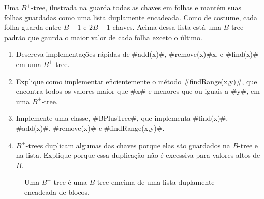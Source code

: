 \begin{exc}
  Uma $B^+$-tree, ilustrada na  guarda todas as chaves em folhas e mantém suas folhas guardadas como uma lista duplamente encadeada. 
Como de costume, cada folha guarda entre 
  $B-1$ e $2B-1$ chaves.  Acima dessa lista está uma 
  $B$-tree padrão que gaurda o maior valor de cada folha exceto o último. 
  \begin{enumerate}
    \item Descreva implementações rápidas de #add(x)#, #remove(x)#x,
      e #find(x)# em uma $B^+$-tree.
    \item Explique como implementar eficientemente o método #findRange(x,y)#,
      que encontra todos os valores maior que #x# e menores que ou iguais a #y#, 
      em uma $B^+$-tree.
    \item Implemente uma classe, #BPlusTree#, que implementa #find(x)#,
      #add(x)#, #remove(x)# e #findRange(x,y)#.
    \item $B^+$-trees duplicam algumas das chaves porque elas são guardados na
      $B$-tree e na lista. Explique porque essa duplicação não é excessiva para
      valores altos de $B$.
  \end{enumerate}
\end{exc}

\begin{figure}
  \caption{Uma $B^+$-tree é uma $B$-tree emcima de uma lista duplamente encadeada de blocos.}
\end{figure}


